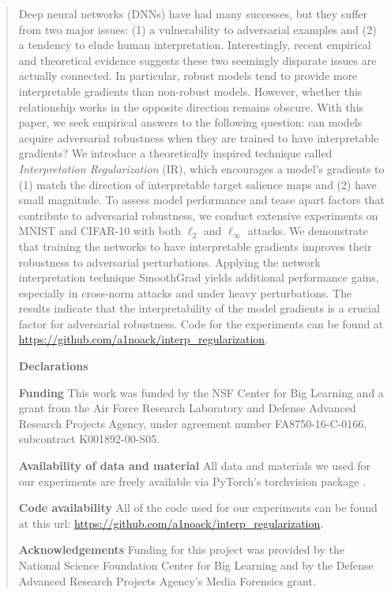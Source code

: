 \begin{abstract}
Deep neural networks (DNNs) have had many successes, but they suffer from two major issues: (1) a vulnerability to adversarial examples and (2) a tendency to elude human interpretation. Interestingly, recent empirical and theoretical evidence suggests these two seemingly disparate issues are actually connected. In particular, robust models tend to provide more interpretable gradients than non-robust models. However, whether this relationship works in the opposite direction remains obscure.
With this paper, we seek empirical answers to the following question: can models acquire adversarial robustness when they are trained to have interpretable gradients? 
We introduce a theoretically inspired technique called \emph{Interpretation Regularization} (IR), which encourages a model's gradients to (1) match the direction of interpretable target salience maps and (2) have small magnitude. 
To assess model performance and tease apart factors that contribute to adversarial robustness, we conduct extensive experiments on MNIST and CIFAR-10 with both $\ell_2$ and $\ell_\infty$ attacks. We demonstrate that training the networks to have interpretable gradients improves their  robustness to adversarial perturbations. Applying the network interpretation technique SmoothGrad \cite{smoothgrad} yields additional performance gains, especially in cross-norm attacks and under heavy perturbations. The results indicate that the interpretability of the model gradients is a crucial factor for adversarial robustness. Code for the experiments can be found at \url{https://github.com/a1noack/interp\_regularization}.


\vspace{.15cm}
\noindent \textbf{Declarations}

\textbf{Funding} This work was funded by the NSF Center for Big Learning and a grant from the Air Force Research Laboratory and Defense Advanced Research Projects Agency, under agreement number FA8750-16-C-0166, subcontract K001892-00-S05.

\textbf{Availability of data and material} All data and materials we used for our experiments are freely available via PyTorch's torchvision package \cite{pytorch}.

\textbf{Code availability} All of the code used for our experiments can be found at this url: 
\url{https://github.com/a1noack/interp\_regularization}.

\vspace{.15cm}
\noindent \textbf{Acknowledgements} Funding for this project was provided by the National Science Foundation Center for Big Learning and by the Defense Advanced Research Projects Agency's Media Forensics grant.

\end{abstract}

